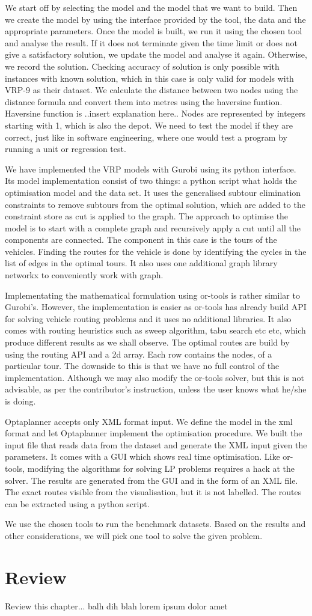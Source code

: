 We start off by selecting the model and the model that we want to build. Then we create the model by using
the interface provided by the tool, the data and the appropriate parameters. Once the model is built, we run it
using the chosen tool and analyse the result. If it does not terminate given the time limit or does not give
a satisfactory solution, we update the model and analyse it again. Otherwise, we record the solution.
Checking accuracy of solution is only possible with instances with known solution, which in this case
is only valid for models with VRP-9 as their dataset. We calculate the distance between two nodes using the
distance formula and convert them into metres using the haversine funtion. Haversine function is ..insert explanation
here.. Nodes are represented by integers starting with 1, which is also the depot. We need to test the model if they are
correct, just like in software engineering, where one would test a program by running a unit or regression test.

We have implemented the VRP models with Gurobi using its python interface. Its model implementation consist of two things:
a python script what holds the optimisation model and the data set. It uses the generalised subtour elimination constraints
to remove subtours from the optimal solution, which are added to the constraint store as cut is applied to the graph.
The approach to optimise the model is to start with a complete graph and recursively apply a cut until all the
components are connected. The component in this case is the tours of the vehicles.
Finding the routes for the vehicle is done by identifying the cycles in the list of edges in the optimal tours. It also
uses one additional graph library networkx to conveniently work with graph.

Implementating the mathematical formulation using or-tools is rather similar to Gurobi's. However, the implementation
is easier as or-tools has already build API for solving vehicle routing problems and it uses no additional libraries.
It also comes with routing heuristics such as sweep algorithm, tabu search etc etc, which produce different results as
we shall observe. The optimal routes are build by using the routing API and a 2d array. Each row contains the nodes,
of a particular tour. The downside to this is that we have no full control of the implementation. Although we may
also modify the or-tools solver, but this is not advisable, as per the contributor's instruction, unless the user knows
what he/she is doing.

Optaplanner accepts only XML format input. We define the model in the xml format and let Optaplanner implement the
optimisation procedure. We built the input file that reads data from the dataset and generate the XML input given the
parameters. It comes with a GUI which shows real time optimisation. Like or-tools, modifying the algorithms
for solving LP problems requires a hack at the solver. The results are generated from the GUI and in the form
of an XML file. The exact routes visible from the visualisation, but it is not labelled. The routes can be extracted using
a python script.

We use the chosen tools to run the benchmark datasets. Based on the results and other considerations, we will pick one
tool to solve the given problem.

\section{Review}
Review this chapter... balh dih blah lorem ipsum dolor amet
